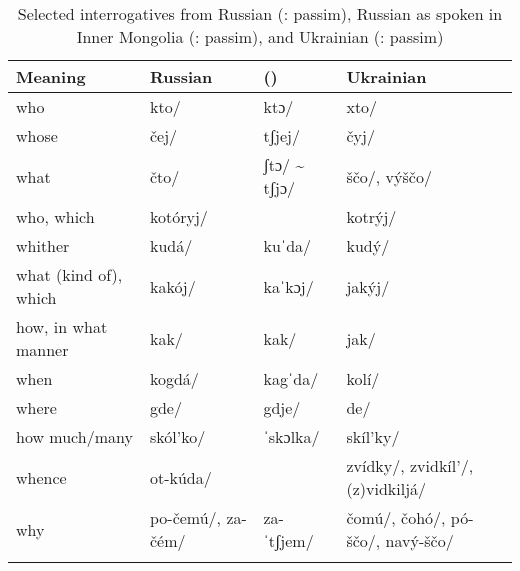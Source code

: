 \begin{table}
\caption{Selected interrogatives from Russian (\citealt{Wade2011}: passim), Russian as spoken in Inner Mongolia (\citealt{BaiPing2011}: passim), and Ukrainian (\citealt{PughPress1999}: passim)}
\label{tab:indo:11}

\begin{tabularx}{\textwidth}{lQlQ}
\lsptoprule

\textbf{Meaning} & \textbf{Russian} & \textbf{ ()} & \textbf{Ukrainian}\\
\midrule
who & kto/ & ktɔ/ & xto/\\
whose & čej/ & tʃjej/ & čyj/\\
what & čto/ & ʃtɔ/ {\textasciitilde} tʃjɔ/ & ščo/, výščo/\\
who, which & kotóryj/ &  & kotrýj/\\
whither & kudá/ & kuˈda/ & kudý/\\
what (kind of), which & kakój/ & kaˈkɔj/ & jakýj/\\
how, in what manner & kak/ & kak/ & jak/\\
when & kogdá/ & kagˈda/ & kolí/\\
where & gde/ & gdje/ & de/\\
how much/many & skól’ko/ & ˈskɔlka/ & skíl’ky/\\
whence & ot-kúda/ &  & zvídky/, zvidkíl’/, (z)vidkiljá/\\
why & po-čemú/, za-čém/ & za-ˈtʃjem/ & čomú/, čohó/, pó-ščo/, navý-ščo/\\
\lspbottomrule
\end{tabularx}
\end{table}

